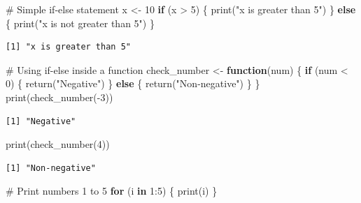 \documentclass[
  letterpaper,
  DIV=11,
  numbers=noendperiod]{scrartcl}
\newenvironment{Shaded}{\begin{snugshade}}{\end{snugshade}}
\newcommand{\CommentTok}[1]{\textcolor[rgb]{0.37,0.37,0.37}{#1}}
\newcommand{\ControlFlowTok}[1]{\textcolor[rgb]{0.00,0.23,0.31}{\textbf{#1}}}
\newcommand{\DecValTok}[1]{\textcolor[rgb]{0.68,0.00,0.00}{#1}}
\newcommand{\FunctionTok}[1]{\textcolor[rgb]{0.28,0.35,0.67}{#1}}
\newcommand{\NormalTok}[1]{\textcolor[rgb]{0.00,0.23,0.31}{#1}}
\newcommand{\OtherTok}[1]{\textcolor[rgb]{0.00,0.23,0.31}{#1}}
\newcommand{\SpecialCharTok}[1]{\textcolor[rgb]{0.37,0.37,0.37}{#1}}
\newcommand{\StringTok}[1]{\textcolor[rgb]{0.13,0.47,0.30}{#1}}
\begin{document}
\begin{Shaded}
\begin{Highlighting}[]
\CommentTok{\#   Simple if{-}else statement}
\NormalTok{x }\OtherTok{\textless{}{-}} \DecValTok{10}
\ControlFlowTok{if}\NormalTok{ (x }\SpecialCharTok{\textgreater{}} \DecValTok{5}\NormalTok{) \{}
  \FunctionTok{print}\NormalTok{(}\StringTok{"x is greater than 5"}\NormalTok{)}
\NormalTok{\} }\ControlFlowTok{else}\NormalTok{ \{}
  \FunctionTok{print}\NormalTok{(}\StringTok{"x is not greater than 5"}\NormalTok{)}
\NormalTok{\}}
\end{Highlighting}
\end{Shaded}

\begin{verbatim}
[1] "x is greater than 5"
\end{verbatim}

\begin{Shaded}
\begin{Highlighting}[]
\CommentTok{\#   Using if{-}else inside a function}
\NormalTok{check\_number }\OtherTok{\textless{}{-}} \ControlFlowTok{function}\NormalTok{(num) \{}
  \ControlFlowTok{if}\NormalTok{ (num }\SpecialCharTok{\textless{}} \DecValTok{0}\NormalTok{) \{}
    \FunctionTok{return}\NormalTok{(}\StringTok{"Negative"}\NormalTok{)}
\NormalTok{  \} }\ControlFlowTok{else}\NormalTok{ \{}
    \FunctionTok{return}\NormalTok{(}\StringTok{"Non{-}negative"}\NormalTok{)}
\NormalTok{  \}}
\NormalTok{\}}
\FunctionTok{print}\NormalTok{(}\FunctionTok{check\_number}\NormalTok{(}\SpecialCharTok{{-}}\DecValTok{3}\NormalTok{))}
\end{Highlighting}
\end{Shaded}

\begin{verbatim}
[1] "Negative"
\end{verbatim}

\begin{Shaded}
\begin{Highlighting}[]
\FunctionTok{print}\NormalTok{(}\FunctionTok{check\_number}\NormalTok{(}\DecValTok{4}\NormalTok{))}
\end{Highlighting}
\end{Shaded}

\begin{verbatim}
[1] "Non-negative"
\end{verbatim}

\begin{Shaded}
\begin{Highlighting}[]
\CommentTok{\#   Print numbers 1 to 5}
\ControlFlowTok{for}\NormalTok{ (i }\ControlFlowTok{in} \DecValTok{1}\SpecialCharTok{:}\DecValTok{5}\NormalTok{) \{}
  \FunctionTok{print}\NormalTok{(i)}
\NormalTok{\}}
\end{Highlighting}
\end{Shaded}
\end{document}
